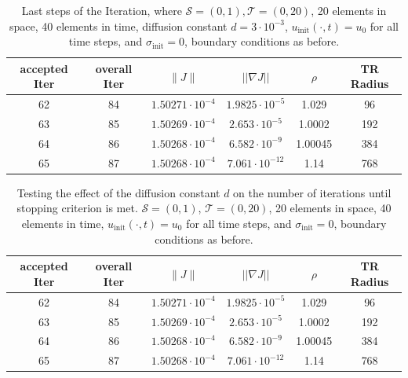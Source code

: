 \documentclass[../draft_1.tex]{subfiles}
\begin{document}
\begin{table}[h!]
	\begin{center}
		\begin{tabular}{c | c | c | c | c | c } 
			\toprule
			accepted Iter & overall Iter & $ \| J \|  $ & $|| \nabla J ||$ & $\rho $ & TR Radius \\ 
			\toprule
			62 & 84 & $1.50271 \cdot 10^{-4}$ & $1.9825 \cdot 10^{-5}$ &  1.029 & 96 \\ 
			63 & 85 & $1.50269 \cdot 10^{-4}$ & $2.653 \cdot 10^{-5}$ & 1.0002 & 192 \\
			64 & 86 & $1.50268 \cdot 10^{-4}$ & $6.582 \cdot 10^{-9}$ & 1.00045 & 384 \\
			65 & 87 & $1.50268 \cdot 10^{-4}$ & $7.061 \cdot 10^{-12}$ & 1.14 & 768 \\
			\bottomrule
			
		\end{tabular}
	\end{center}
	\caption{Last steps of the Iteration, where $\mathcal{S} = (0, 1), \mathcal{T} = (0, 20)$, 20 elements in space, 40 elements in time, diffusion constant $d=3 \cdot 10^{-3}$, $u_{\text{init}} (\cdot,t)= u_0$ for all time steps, and $\sigma_{\text{init}} = 0$, boundary conditions as before.}
		\label{table: conv_results_bigger_dif}
\end{table}


\begin{table}[h!]
	\begin{center}
		\begin{tabular}{c | c | c | c | c | c } 
			\toprule
			accepted Iter & overall Iter & $ \| J \|  $ & $|| \nabla J ||$ & $\rho $ & TR Radius \\ 
			\toprule
			62 & 84 & $1.50271 \cdot 10^{-4}$ & $1.9825 \cdot 10^{-5}$ &  1.029 & 96 \\ 
			63 & 85 & $1.50269 \cdot 10^{-4}$ & $2.653 \cdot 10^{-5}$ & 1.0002 & 192 \\
			64 & 86 & $1.50268 \cdot 10^{-4}$ & $6.582 \cdot 10^{-9}$ & 1.00045 & 384 \\
			65 & 87 & $1.50268 \cdot 10^{-4}$ & $7.061 \cdot 10^{-12}$ & 1.14 & 768 \\
			\bottomrule
			
		\end{tabular}
	\end{center}
	\caption{Testing the effect of the diffusion constant $d$ on the number of iterations until stopping criterion is met. $\mathcal{S} = (0, 1)$,  $\mathcal{T} = (0, 20)$, 20 elements in space, 40 elements in time, $u_{\text{init}} (\cdot,t)= u_0$ for all time steps, and $\sigma_{\text{init}} = 0$, boundary conditions as before.}
\end{table}
\end{document}
